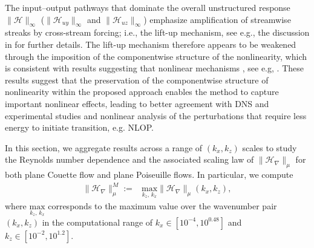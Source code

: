 

 
 The input--output pathways that dominate the overall unstructured response $\|\mathcal{H}\|_{\infty}$ ($\|\mathcal{H}_{uy}\|_{\infty}$ and $\|\mathcal{H}_{uz}\|_{\infty}$) emphasize amplification of streamwise streaks by cross-stream forcing; i.e., the lift-up mechanism, see e.g., the discussion in  \citet{jovanovic2020bypass} for further details.  The lift-up mechanism therefore appears to be weakened through the imposition of the componentwise structure of the nonlinearity, which is consistent with results suggesting that nonlinear mechanisms , see e.g, \citet{Duguet2013,Brandt2014}. These results suggest that the preservation of the componentwise structure of nonlinearity within the proposed approach enables the method to capture important nonlinear effects, leading to better agreement with DNS and experimental studies and nonlinear analysis of the perturbations that require less energy to initiate transition, e.g. NLOP.  
 
 
 



In this section, we aggregate results across a range of $(k_x,k_z)$ scales to study the Reynolds number dependence and the associated scaling law of $\|\mathcal{H}_{\nabla}\|_{\mu}$ for both plane Couette flow and plane Poiseuille flows. In particular, we compute
\begin{align}
    \|\mathcal{H}_{\nabla}\|_{\mu}^M:=&\underset{k_z,\,k_x}{\text{max}}\|\mathcal{H}_{\nabla}\|_{\mu}(k_x,k_z), 
    \label{eq:H_nabla_mu_M}
\end{align}
where $\underset{k_z,\,k_x}{\text{max}}$ corresponds to the maximum value over the  wavenumber pair $(k_x,k_z)$ in the computational range of $k_x \in [10^{-4},10^{0.48}]$ and $k_z \in [10^{-2},10^{1.2}]$. 

